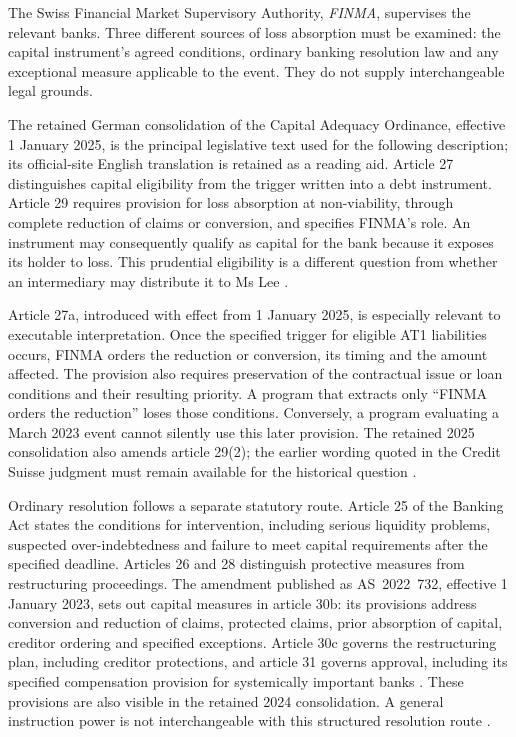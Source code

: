 The Swiss Financial Market Supervisory Authority, \emph{FINMA}, supervises the
relevant banks. Three different sources of loss absorption must be examined:
the capital instrument's agreed conditions, ordinary banking resolution law and
any exceptional measure applicable to the event. They do not supply
interchangeable legal grounds.

The retained German consolidation of the Capital Adequacy Ordinance, effective
1 January 2025, is the principal legislative text used for the following
description; its official-site English translation is retained as a reading
aid. Article 27 distinguishes capital eligibility from the trigger written
into a debt instrument. Article 29 requires provision for loss absorption at
non-viability, through complete reduction of claims or conversion, and specifies
FINMA's role. An instrument may consequently qualify as capital for the bank
because it exposes its holder to loss. This prudential eligibility is a different
question from whether an intermediary may distribute it to Ms Lee
\citep[arts.~27--29]{swisscao2025}.

Article 27a, introduced with effect from 1 January 2025, is especially relevant
to executable interpretation. Once the specified trigger for eligible AT1
liabilities occurs, FINMA orders the reduction or conversion, its timing and
the amount affected. The provision also requires preservation of the
contractual issue or loan conditions and their resulting priority. A program
that extracts only ``FINMA orders the reduction'' loses those conditions.
Conversely, a program evaluating a March 2023 event cannot silently use this
later provision. The retained 2025 consolidation also amends article 29(2);
the earlier wording quoted in the Credit Suisse judgment must remain available
for the historical question
\citep[arts.~27a and 29, amendment footnotes]{swisscao2025}.

Ordinary resolution follows a separate statutory route. Article 25 of the
Banking Act states the conditions
for intervention, including serious liquidity problems, suspected
over-indebtedness and failure to meet capital requirements after the specified
deadline. Articles 26 and 28 distinguish protective measures from restructuring
proceedings. The amendment published as AS~2022~732, effective 1 January 2023,
sets out capital measures in article 30b: its provisions address conversion and
reduction of claims, protected claims, prior absorption of capital, creditor
ordering and specified exceptions. Article 30c governs the restructuring plan,
including creditor protections, and article 31 governs approval, including its
specified compensation provision for systemically important banks
\citep[arts.~30b--31 and commencement provision]{swissbankamend2022}. These
provisions are also visible in the retained 2024 consolidation. A general
instruction power is not interchangeable with this structured resolution route
\citep[arts.~25--31]{swissbank2024}.

